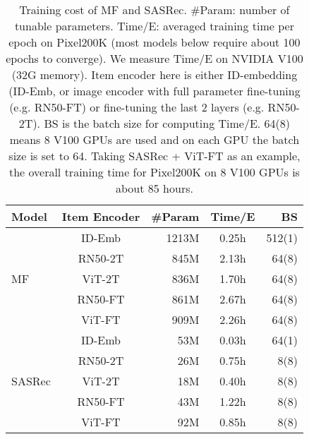 \documentclass[sigconf]{acmart}
\begin{document}
		
	\begin{table}[h]
		\centering
		
		\caption{Training cost of MF and SASRec. \#Param: number of tunable parameters. Time/E: averaged training time per epoch  on Pixel200K  (most models below require about 100 epochs to converge).
			We measure Time/E on NVIDIA V100 (32G memory). Item encoder here is either ID-embedding (ID-Emb, or image encoder with full parameter fine-tuning (e.g. RN50-FT) or fine-tuning the last 2 layers (e.g. RN50-2T). 
BS is the batch size for computing Time/E. 64(8) means 8 V100 GPUs are used and on each GPU the batch size is set to 64. 
   Taking SASRec + ViT-FT as an example,  the overall training time for Pixel200K on 8 V100 GPUs is about 85 hours.
		}

		\label{tab:time_compare}
		\setlength{\tabcolsep}{8pt}
\begin{tabular}{lcrcr}
\toprule
			Model & Item Encoder  & \#Param& Time/E & BS   \\
\midrule
			\multirow{5}{*}{MF} & ID-Emb & 1213M &  	 0.25h & 512(1)\\
			& RN50-2T & 845M &  2.13h &  64(8)\\
			& ViT-2T & 836M  &1.70h & 64(8)\\
			& RN50-FT & 861M &  2.67h &  64(8)\\
			& ViT-FT & 909M  &2.26h & 64(8)\\
			
			\midrule
			\multirow{5}{*}{SASRec} & ID-Emb &53M & 0.03h & 64(1)\\
			& RN50-2T &26M & 0.75h & 8(8) \\
			& ViT-2T & 18M&  0.40h & 8(8)\\ 
			& RN50-FT &43M & 1.22h & 8(8)\\
			& ViT-FT & 92M&  0.85h & 8(8) \\ 
			\bottomrule
		\end{tabular}
	
\end{table}

\newpage
\normalem


\end{document}
